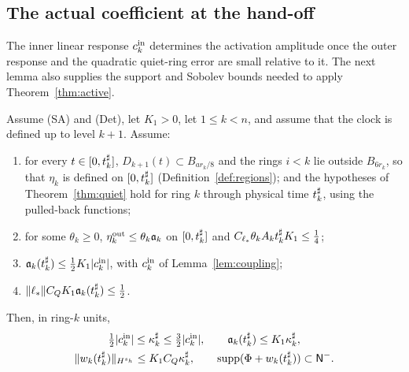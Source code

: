 \subsection{The actual coefficient at the hand-off}
\label{sec:relay-handoff}

The inner linear response $c^{\mathrm{in}}_k$ determines the activation amplitude once
the outer response and the quadratic quiet-ring error are small relative to
it. The next lemma also supplies the support and Sobolev bounds needed to
apply Theorem~\ref{thm:active}.

\begin{lemma}
\label{lem:handoff}
Assume (SA) and (Det), let $K_1>0$, let $1\le k<n$, and assume that the clock is
defined up to level $k+1$. Assume:
\begin{enumerate}[label=\textup{(\roman*)}]
\item for every $t\in[0,t^\sharp_k]$, $D_{k+1}(t)\subset B_{ar_k/8}$ and the rings
  $i<k$ lie outside $B_{6r_k}$, so that $\eta_k$ is defined on $[0,t^\sharp_k]$
  (Definition~\ref{def:regions}); and the hypotheses of Theorem~\ref{thm:quiet}
  hold for ring $k$ through physical time $t^\sharp_k$, using the pulled-back functions;
\item for some $\theta_k\ge0$, $\eta^{\mathrm{out}}_k\le\theta_k\mathfrak{a}_k$ on $[0,t^\sharp_k]$ and
  $C_{\ell_*}\theta_kA_kt^\sharp_kK_1\le\frac14$;
\item $\mathfrak{a}_k(t^\sharp_k)\le\frac12K_1|c^{\mathrm{in}}_k|$, with $c^{\mathrm{in}}_k$ of Lemma~\ref{lem:coupling};
\item $\|\ell_*\|C_QK_1\mathfrak{a}_k(t^\sharp_k)\le\frac12$.
\end{enumerate}
Then, in ring-$k$ units,
\begin{equation}
\label{eq:handoff}
\begin{gathered}
\tfrac12|c^{\mathrm{in}}_k|\le\kappa^\sharp_k\le\tfrac32|c^{\mathrm{in}}_k|,\qquad \mathfrak{a}_k(t^\sharp_k)\le K_1\kappa^\sharp_k,\\
\|w_k(t^\sharp_k)\|_{H^{s_h}}\le K_1C_Q\kappa^\sharp_k,\qquad \operatorname{supp}(\Phi+w_k(t^\sharp_k))\subset\mathsf{N}^{-} .
\end{gathered}
\end{equation}
\end{lemma}

